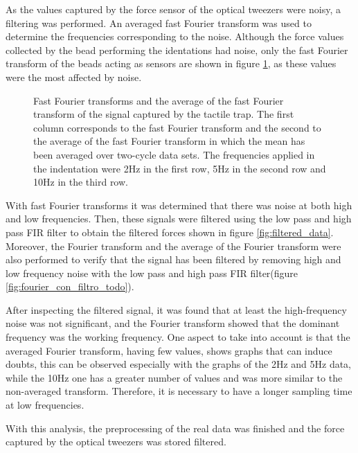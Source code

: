 \documentclass[12pt, a4paper]{article} %
\begin{document}
As the values captured by the force sensor of the optical tweezers were noisy, a filtering was performed. An averaged fast Fourier transform was used to determine the frequencies corresponding to the noise. Although the force values collected by the bead performing the identations had noise, only the fast Fourier transform of the beads acting as sensors are shown in figure \ref{fig:fourier_sin_filtro}, as these values were the most affected by noise. 
\begin{figure}[htbp]
  \centering
  
  \caption{Fast Fourier transforms and the average of the fast Fourier transform of the signal captured by the tactile trap. The first column corresponds to the fast Fourier transform and the second to the average of the fast Fourier transform in which the mean has been averaged over two-cycle data sets. The frequencies applied in the indentation were 2Hz in the first row, 5Hz in the second row and 10Hz in the third row.}
  \label{fig:fourier_sin_filtro}
\end{figure}

\newpage

With fast Fourier transforms it was determined that there was noise at both high and low frequencies. Then, these signals were filtered using the low pass and high pass FIR filter to obtain the filtered forces shown in figure \ref{fig:filtered_data}. Moreover, the Fourier transform and the average of the Fourier transform were also performed to verify that the signal has been filtered by removing high and low frequency noise with the low pass and high pass FIR filter(figure \ref{fig:fourier_con_filtro_todo}).

After inspecting the filtered signal, it was found that at least the high-frequency noise was not significant, and the Fourier transform showed that the dominant frequency was the working frequency. One aspect to take into account is that the averaged Fourier transform, having few values, shows graphs that can induce doubts, this can be observed especially with the graphs of the 2Hz and 5Hz data, while the 10Hz one has a greater number of values and was more similar to the non-averaged transform. Therefore, it is necessary to have a longer sampling time at low frequencies.

With this analysis, the preprocessing of the real data was finished and the force captured by the optical tweezers was stored filtered.
\end{document}
